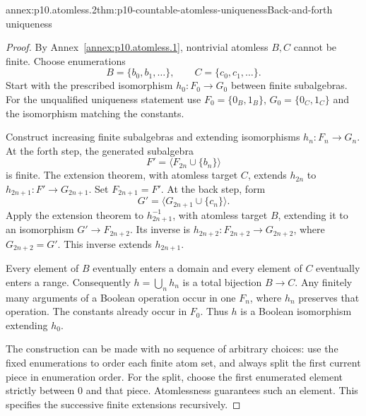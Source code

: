 \begin{annexitem}{annex:p10.atomless.2}{thm:p10-countable-atomless-uniqueness}{Back-and-forth uniqueness}
\begin{proof}
By Annex~\ref{annex:p10.atomless.1}, nontrivial atomless \(B,C\)
cannot be finite.
Choose enumerations
\[
 B=\{b_0,b_1,\ldots\},\qquad C=\{c_0,c_1,\ldots\}.
\]
Start with the prescribed isomorphism \(h_0:F_0\to G_0\)
between finite subalgebras.
For the unqualified uniqueness statement use
\(F_0=\{0_B,1_B\}\), \(G_0=\{0_C,1_C\}\) and the
isomorphism matching the constants.

Construct increasing finite subalgebras and extending isomorphisms
\(h_n:F_n\to G_n\).
At the forth step, the generated subalgebra
\[
 F'=\langle F_{2n}\cup\{b_n\}\rangle
\]
is finite.  The extension theorem, with atomless target \(C\),
extends \(h_{2n}\) to
\(h_{2n+1}:F'\to G_{2n+1}\).
Set \(F_{2n+1}=F'\).
At the back step, form
\[
 G'=\langle G_{2n+1}\cup\{c_n\}\rangle.
\]
Apply the extension theorem to \(h_{2n+1}^{-1}\), with
atomless target \(B\), extending it to an isomorphism
\(G'\to F_{2n+2}\).
Its inverse is \(h_{2n+2}:F_{2n+2}\to G_{2n+2}\), where
\(G_{2n+2}=G'\).
This inverse extends \(h_{2n+1}\).

Every element of \(B\) eventually enters a domain and every
element of \(C\) eventually enters a range.
Consequently \(h=\bigcup_n h_n\) is a total bijection \(B\to C\).
Any finitely many arguments of a Boolean operation occur in
one \(F_n\), where \(h_n\) preserves that operation.
The constants already occur in \(F_0\).
Thus \(h\) is a Boolean isomorphism extending \(h_0\).

The construction can be made with no sequence of arbitrary choices:
use the fixed enumerations to order each finite atom set, and
always split the first current piece in enumeration order.
For the split, choose the first enumerated element strictly
between \(0\) and that piece.
Atomlessness guarantees such an element.
This specifies the successive finite extensions recursively.
\end{proof}
\end{annexitem}

